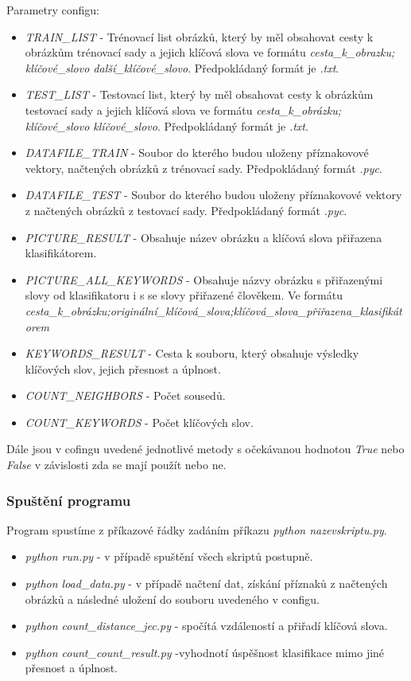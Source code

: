 \documentclass[czech,BP]{thesiskiv}
\begin{document}
\vspace{1cm} 
Parametry configu:
\begin{itemize}
	\item \textit{TRAIN\_LIST} - Trénovací list obrázků, který by měl obsahovat cesty k obrázkům trénovací sady a jejich klíčová slova ve formátu \textit{cesta\_k\_obrazku; klíčové\_slovo další\_klíčové\_slovo}. Předpokládaný formát je \textit{.txt}.
	\item \textit{TEST\_LIST} - Testovací list, který by měl obsahovat cesty k obrázkům testovací sady a jejich klíčová slova ve formátu \textit{cesta\_k\_obrázku; klíčové\_slovo klíčové\_slovo}. Předpokládaný formát je \textit{.txt}.
	\item \textit{DATAFILE\_TRAIN} - Soubor do kterého budou uloženy příznakovové vektory, načtených obrázků z trénovací sady. Předpokládaný formát \textit{.pyc}.
		\item \textit{DATAFILE\_TEST} - Soubor do kterého budou uloženy příznakovové vektory z načtených obrázků z testovací sady. Předpokládaný formát \textit{.pyc}.
	\item \textit{PICTURE\_RESULT} - Obsahuje název obrázku a klíčová slova přiřazena klasifikátorem.
	\item \textit{PICTURE\_ALL\_KEYWORDS} - Obsahuje názvy obrázku s přiřazenými slovy od klasifikatoru i s se slovy přiřazené člověkem. Ve formátu \textit{cesta\_k\_obrázku;originální\_klíčová\_slova;klíčová\_slova\_přiřazena\_klasifikátorem}
	\item \textit{KEYWORDS\_RESULT} - Cesta k souboru, který obsahuje výsledky klíčových slov, jejich přesnost a úplnost.
	\item \textit{COUNT\_NEIGHBORS} - Počet sousedů.
	\item \textit{COUNT\_KEYWORDS} - Počet klíčových slov.
\end{itemize}
Dále jsou v cofingu uvedené jednotlivé metody s očekávanou hodnotou \textit{True} nebo \textit{False} v závislosti zda se mají použít nebo ne.

\subsubsection{Spuštění programu}
Program spustíme z příkazové řádky zadáním příkazu \textit{python nazevskriptu.py}. 
\begin{itemize}
	\item \textit{python run.py} - v případě spuštění všech skriptů postupně.
	\item \textit{python load\_data.py} - v případě načtení dat, získání příznaků z načtených obrázků a následné uložení do souboru uvedeného v configu.
	\item \textit{python count\_distance\_jec.py} - spočítá vzdáleností a přiřadí klíčová slova.
	\item \textit{python count\_count\_result.py} -vyhodnotí úspěšnost klasifikace mimo jiné přesnost a úplnost.
\end{itemize}
\end{document}
